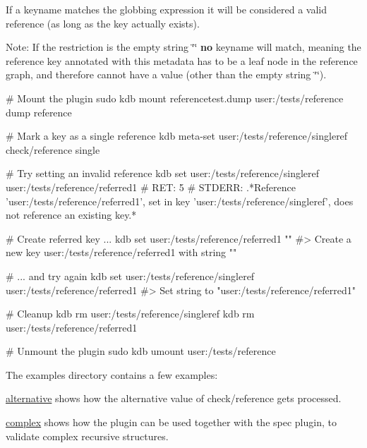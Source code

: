 If a keyname matches the globbing expression it will be considered a valid reference (as long as the key actually exists).

Note\+: If the restriction is the empty string {\ttfamily \char`\"{}\char`\"{}} {\bfseries no} keyname will match, meaning the reference key annotated with this metadata has to be a leaf node in the reference graph, and therefore cannot have a value (other than the empty string {\ttfamily \char`\"{}\char`\"{}}).


\begin{DoxyCode}
# Mount the plugin
sudo kdb mount referencetest.dump user:/tests/reference dump reference

# Mark a key as a single reference
kdb meta-set user:/tests/reference/singleref check/reference single

# Try setting an invalid reference
kdb set user:/tests/reference/singleref user:/tests/reference/referred1
# RET: 5
# STDERR: .*Reference 'user:/tests/reference/referred1', set in key 'user:/tests/reference/singleref', does
       not reference an existing key.*

# Create referred key ...
kdb set user:/tests/reference/referred1 ""
#> Create a new key user:/tests/reference/referred1 with string ""

# ... and try again
kdb set user:/tests/reference/singleref user:/tests/reference/referred1
#> Set string to "user:/tests/reference/referred1"

# Cleanup
kdb rm user:/tests/reference/singleref
kdb rm user:/tests/reference/referred1

# Unmount the plugin
sudo kdb umount user:/tests/reference
\end{DoxyCode}


The examples directory contains a few examples\+:


\begin{DoxyItemize}
\item \hyperlink{autotoc_md554_src_plugins_reference_examples_alternative_README_md}{alternative} shows how the {\ttfamily alternative} value of {\ttfamily check/reference} gets processed.
\item \hyperlink{autotoc_md555_src_plugins_reference_examples_complex_README_md}{complex} shows how the plugin can be used together with the spec plugin, to validate complex recursive structures. 
\end{DoxyItemize}